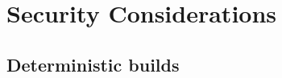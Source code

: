 \section{Security Considerations}
\label{sec:security}

\subsection{Deterministic builds}
\label{sec:deterministic-builds}


















